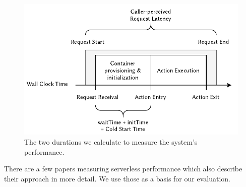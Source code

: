 \begin{figure}
    \begin{center}
        \includegraphics{figures/EvaluationTimeMeasurement.pdf}
    \end{center}
    \caption{The two durations we calculate to measure the system's performance.}
    \label{fig:evaluation-time-measurement}
\end{figure}





There are a few papers measuring serverless performance which also describe their approach in more detail. We use those as a basis for our evaluation.

